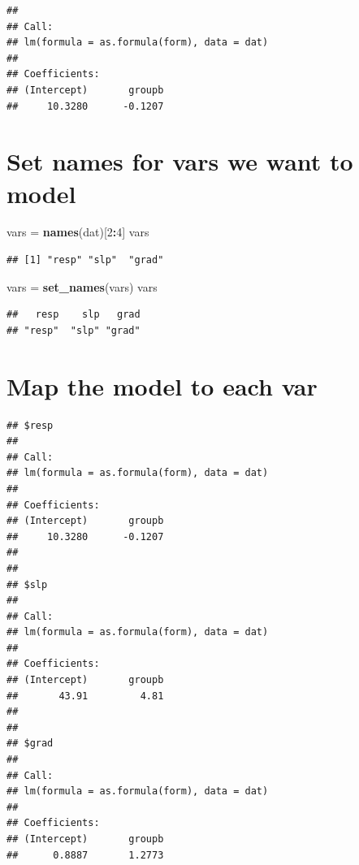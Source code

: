 \documentclass[]{article}
\newenvironment{Shaded}{\begin{snugshade}}{\end{snugshade}}
\newcommand{\KeywordTok}[1]{\textcolor[rgb]{0.13,0.29,0.53}{\textbf{#1}}}
\newcommand{\DecValTok}[1]{\textcolor[rgb]{0.00,0.00,0.81}{#1}}
\newcommand{\StringTok}[1]{\textcolor[rgb]{0.31,0.60,0.02}{#1}}
\newcommand{\OperatorTok}[1]{\textcolor[rgb]{0.81,0.36,0.00}{\textbf{#1}}}
\newcommand{\NormalTok}[1]{#1}
\begin{document}
\begin{verbatim}
## 
## Call:
## lm(formula = as.formula(form), data = dat)
## 
## Coefficients:
## (Intercept)       groupb  
##     10.3280      -0.1207
\end{verbatim}

\section{Set names for vars we want to
model}\label{set-names-for-vars-we-want-to-model}

\begin{Shaded}
\begin{Highlighting}[]
\NormalTok{vars =}\StringTok{ }\KeywordTok{names}\NormalTok{(dat)[}\DecValTok{2}\OperatorTok{:}\DecValTok{4}\NormalTok{]}
\NormalTok{vars}
\end{Highlighting}
\end{Shaded}

\begin{verbatim}
## [1] "resp" "slp"  "grad"
\end{verbatim}

\begin{Shaded}
\begin{Highlighting}[]
\NormalTok{vars =}\StringTok{ }\KeywordTok{set_names}\NormalTok{(vars)}
\NormalTok{vars}
\end{Highlighting}
\end{Shaded}

\begin{verbatim}
##   resp    slp   grad 
## "resp"  "slp" "grad"
\end{verbatim}

\section{Map the model to each var}\label{map-the-model-to-each-var}

\begin{Shaded}
\end{Shaded}

\begin{verbatim}
## $resp
## 
## Call:
## lm(formula = as.formula(form), data = dat)
## 
## Coefficients:
## (Intercept)       groupb  
##     10.3280      -0.1207  
## 
## 
## $slp
## 
## Call:
## lm(formula = as.formula(form), data = dat)
## 
## Coefficients:
## (Intercept)       groupb  
##       43.91         4.81  
## 
## 
## $grad
## 
## Call:
## lm(formula = as.formula(form), data = dat)
## 
## Coefficients:
## (Intercept)       groupb  
##      0.8887       1.2773
\end{verbatim}
\end{document}
